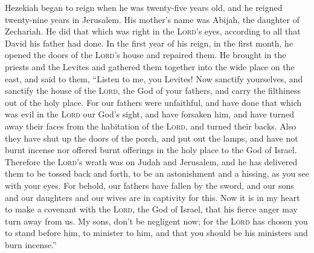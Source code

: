  Hezekiah began to reign when he was twenty-five years
old, and he reigned twenty-nine years in Jerusalem. His mother's name
was Abijah, the daughter of Zechariah.  He did that which
was right in the \textsc{Lord}'s eyes, according to all that David his
father had done.  In the first year of his reign, in the
first month, he opened the doors of the \textsc{Lord}'s house and
repaired them.  He brought in the priests and the Levites
and gathered them together into the wide place on the east,
 and said to them, ``Listen to me, you Levites! Now
sanctify yourselves, and sanctify the house of the \textsc{Lord}, the
God of your fathers, and carry the filthiness out of the holy place.
 For our fathers were unfaithful, and have done that which
was evil in the \textsc{Lord} our God's sight, and have forsaken him,
and have turned away their faces from the habitation of the
\textsc{Lord}, and turned their backs.  Also they have
shut up the doors of the porch, and put out the lamps, and have not
burnt incense nor offered burnt offerings in the holy place to the God
of Israel.  Therefore the \textsc{Lord}'s wrath was on
Judah and Jerusalem, and he has delivered them to be tossed back and
forth, to be an astonishment and a hissing, as you see with your eyes.
 For behold, our fathers have fallen by the sword, and our
sons and our daughters and our wives are in captivity for this.
 Now it is in my heart to make a covenant with the
\textsc{Lord}, the God of Israel, that his fierce anger may turn away
from us.  My sons, don't be negligent now; for the
\textsc{Lord} has chosen you to stand before him, to minister to him,
and that you should be his ministers and burn incense.''

